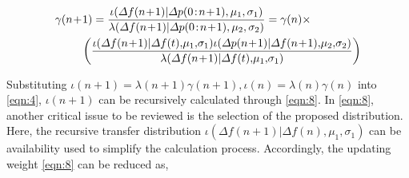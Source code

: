 \documentclass[lettersize,journal]{IEEEtran}
\begin{document}
\vspace{-0.125in}
\begin{small}
	\begin{align}\label{eqn:8}
		 & \gamma(n\!+\! 1)=
		\frac{\iota(\varDelta f(n\!+\!1)|\varDelta p(0\!:\!n\!+\!1),\mu_1,\sigma_1)}{\lambda(\varDelta f(n\!+\!1)|\varDelta p(0\!:\!n\!+\!1),\mu_2,\sigma_2)}=\gamma(n)\times                                                                     \\
		 & \qquad\,\, \left(\frac{\iota(\varDelta f(n\!+\!1)|\varDelta f(t),\!\mu_1,\!\sigma_1)\iota(\varDelta p(n\!+\!1)|\varDelta f(n\!+\!1),\!\mu_2,\!\sigma_2)}{\lambda(\varDelta f(n\!+\!1)|\varDelta f(t),\!\mu_1,\!\sigma_1)}\right)\notag
	\end{align}
\end{small}

Substituting $\iota(n+1) = \lambda (n+1)\gamma(n+1), \iota(n) = \lambda (n)\gamma(n)$ into \eqref{eqn:4}, $\iota(n+1)$ can be recursively calculated through \eqref{eqn:8}. In \eqref{eqn:8}, another critical issue to be reviewed is the selection of the proposed distribution. Here, the recursive transfer distribution $\iota(\varDelta f(n+1)|\varDelta f(n),\mu_1,\sigma_1)$ can be availability used to simplify the calculation process. Accordingly, the updating weight \eqref{eqn:8} can be reduced as,
\end{document}
